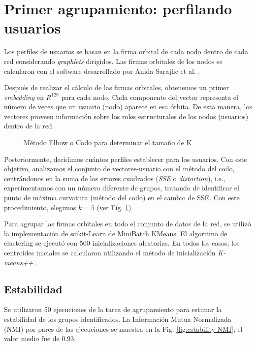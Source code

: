 \section{Primer agrupamiento: perfilando usuarios}
Los perfiles de usuarios se basan en la firma orbital de cada nodo dentro de cada red considerando \textit{graphlets} dirigidos. Las firmas orbitales de los nodos se calcularon con el software desarrollado por Anida Sarajlic et al. \cite{sarajlic_graphlet-based_2016}. 

Después de realizar el cálculo de las firmas orbitales, obtenemos un primer \textit{embedding} en ${R}^{129}$ para cada nodo. Cada componente del vector representa el número de veces que un usuario (nodo) aparece en esa órbita. De esta manera, los vectores proveen información sobre los roles estructurales de los nodos (usuarios) dentro de la red.

 \begin{figure}[htbp]
   \centering
   
    \caption{Método Elbow o Codo para determinar el tamaño de K}
    \label{fig:elbowmethod}
\end{figure}

Posteriormente, decidimos cuántos perfiles establecer para los usuarios. Con este objetivo, analizamos el conjunto de vectores-usuario con el método del codo, centrándonos en la suma de los errores cuadrados (\textit{SSE} o \textit{distortion}), i.e., experimentamos con un número diferente de grupos, tratando de identificar el punto de máxima curvatura (método del codo) en el cambio de SSE. Con este procedimiento, elegimos $k = 5$ (ver Fig. \ref{fig:elbowmethod}).

Para agrupar las firmas orbitales en todo el conjunto de datos de la red, se utilizó la implementación de scikit-Learn de MiniBatch KMeans. El algoritmo de clustering se ejecutó con 500 inicializaciones aleatorias. En todos los casos, los centroides iniciales se calcularon utilizando el método de inicialización \textit{K-means++} \cite{arthur_k-means_nodate}. 

\subsection{Estabilidad}
Se utilizaron 50 ejecuciones de la tarea de agrupamiento para estimar la estabilidad de los grupos identificados. La Información Mutua Normalizada (NMI) por pares de las ejecuciones se muestra en la Fig. \ref{fig:estability-NMI}; el valor medio fue de 0.93.

